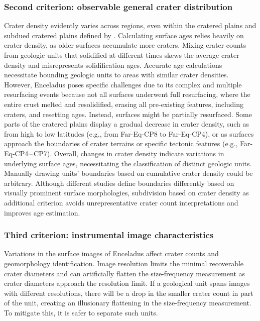 \documentclass[preprint,11pt,3p,times,authoryear]{elsarticle}
\begin{document}
\subsubsection{Second criterion: observable general crater distribution}
Crater density evidently varies across regions, even within the cratered plains and subdued cratered plains defined by \citet{CrowWillard2015}. Calculating surface ages relies heavily on crater density, as older surfaces accumulate more craters. Mixing crater counts from geologic units that solidified at different times skews the average crater density and misrepresents solidification ages. Accurate age calculations necessitate bounding geologic units to areas with similar crater densities. However, Enceladus poses specific challenges due to its complex and multiple resurfacing events because not all surfaces underwent full resurfacing, where the entire crust melted and resolidified, erasing all pre-existing features, including craters, and resetting ages. Instead, surfaces might be partially resurfaced. Some parts of the cratered plains display a gradual decrease in crater density, such as from high to low latitudes (e.g., from Far-Eq-CP8 to Far-Eq-CP4), or as surfaces approach the boundaries of crater terrains or specific tectonic features (e.g., Far-Eq-CP4$\sim$CP7). Overall, changes in crater density indicate variations in underlying surface ages, necessitating the classification of distinct geologic units.\\

Manually drawing units’ boundaries based on cumulative crater density could be arbitrary. Although different studies define boundaries differently based on visually prominent surface morphologies, subdivision based on crater density as additional criterion avoids unrepresentative crater count interpretations and improves age estimation.

\subsubsection{Third criterion: instrumental image characteristics}
Variations in the surface images of Enceladus affect crater counts and geomorphology identification. Image resolution limits the minimal recoverable crater diameters and can artificially flatten the size-frequency measurement as crater diameters approach the resolution limit. If a geological unit spans images with different resolutions, there will be a drop in the smaller crater count in part of the unit, creating an illusionary flattening in the size-frequency measurement. To mitigate this, it is safer to separate such units.\\
\end{document}
